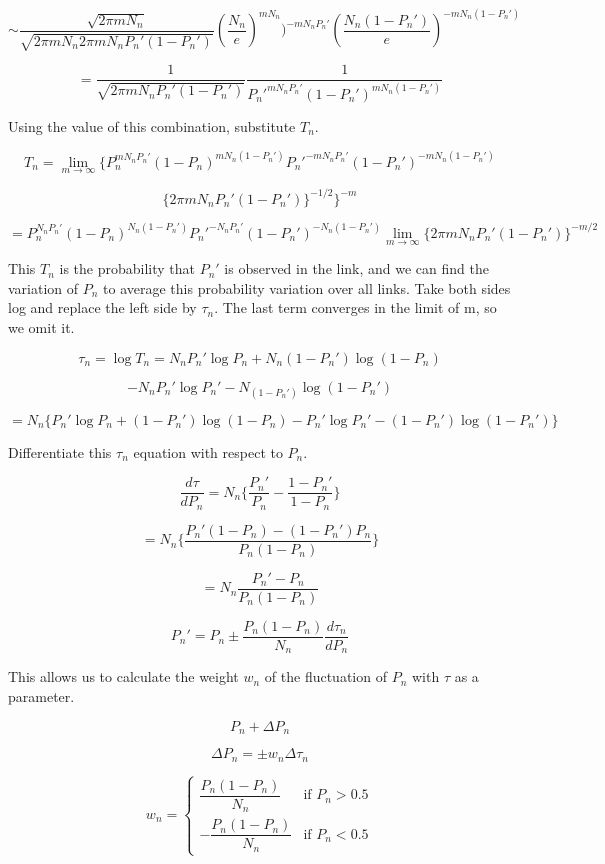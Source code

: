 \documentclass[12pt]{article}
\begin{document}
\[ \sim \frac{\sqrt{2\pi mN_n}}{\sqrt{2\pi mN_n 2\pi mN_n P_n'(1-P_n')}} \left(\frac{N_n}{e}\right)^{mN_n} )^{-mN_nP_n'} \left(\frac{N_n(1-P_n')}{e}\right)^{-mN_n(1-P_n')}\]

\[ = \frac{1}{\sqrt{2\pi mN_n P_n'(1-P_n')}}\frac{1}{P_n'^{mN_nP_n'} (1-P_n')^{mN_n(1-P_n')}}\]

Using the value of this combination, substitute \(T_n\).

\[ T_n=\lim_{m \to \infty } \{P_n^{mN_nP_n'}(1-P_n)^{mN_n(1-P_n')} P_n'^{-mN_nP_n'} (1-P_n')^{-mN_n(1-P_n')}\]

\[\{2\pi mN_n P_n'(1-P_n')\}^{-1/2} \}^{-m}\]

\[= P_n^{N_nP_n'}(1-P_n)^{N_n(1-P_n')} P_n'^{-N_nP_n'} (1-P_n')^{-N_n(1-P_n')} \lim_{m \to \infty } \{2\pi mN_n P_n'(1-P_n') \}^{-m/2} \]

This \(T_n\) is the probability that \(P_n'\) is observed in the link,
and we can find the variation of \(P_n\) to average this probability
variation over all links. Take both sides log and replace the left side
by \(\tau_n\). The last term converges in the limit of m, so we omit it.

\[ \tau_n = \log T_n = N_nP_n' \log P_n + N_n(1-P_n')\log(1-P_n) \]

\[- N_nP_n'\log P_n' -N_(1-P_n')\log(1-P_n') \]

\[ = N_n \{ P_n' \log P_n + (1-P_n')\log(1-P_n) - P_n'\log P_n' - (1-P_n')\log(1-P_n') \} \]

Differentiate this \(\tau_n\) equation with respect to \(P_n\).

\[ \frac{d\tau}{dP_n}=N_n \{ \frac{P_n'}{P_n}-\frac{1-P_n'}{1-P_n}\}\]

\[ = N_n \{ \frac{P_n'(1-P_n)-(1-P_n')P_n}{P_n(1-P_n)} \}\]

\[ = N_n \frac{P_n'-P_n}{P_n(1-P_n)} \]

\[ P_n'=P_n \pm \frac{P_n(1-P_n)}{N_n} \frac{d \tau_n}{d P_n} \]

This allows us to calculate the weight \(w_n\) of the fluctuation of
\(P_n\) with \(\tau\) as a parameter.

\[P_n + \Delta P_n\]

\[ \Delta P_n = \pm w_n \Delta \tau_n\]

\[
w_n = 
\begin{cases}
  \dfrac{P_n(1 - P_n)}{N_n} & \text{if } P_n > 0.5 \\
  -\dfrac{P_n(1 - P_n)}{N_n} & \text{if } P_n < 0.5
\end{cases}
\]
\end{document}
